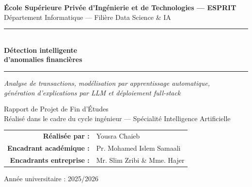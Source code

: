 \documentclass[12pt,a4paper,twoside]{report}
\begin{document}

\begin{titlepage}
\centering

\vspace{1cm}

{\large \textbf{École Supérieure Privée d'Ingénierie et de Technologies --- ESPRIT}}\\[0.3cm]
{\large Département Informatique --- Filière Data Science \& IA}

\vspace{1.5cm}

\rule{\linewidth}{0.4pt}\\[0.4cm]
{\fontsize{24}{28}\selectfont \textbf{Détection intelligente\\[0.2cm] d'anomalies financières}}\\[0.4cm]
\rule{\linewidth}{0.4pt}

\vspace{0.6cm}

{\large \textit{Analyse de transactions, modélisation par apprentissage automatique,\\génération d'explications par LLM et déploiement full-stack}}

\vspace{1.5cm}

{\large Rapport de Projet de Fin d'Études}\\[0.2cm]
{\normalsize Réalisé dans le cadre du cycle ingénieur --- Spécialité Intelligence Artificielle}

\vspace{1.5cm}

\begin{tabular}{rl}
  \textbf{Réalisée par :}          & Yousra Chaieb \\[0.2cm]
  \textbf{Encadrant académique :}  & Pr. Mohamed Islem Samaali \\[0.2cm]
  \textbf{Encadrants entreprise :} & Mr. Slim Zribi \& Mme. Hajer \\[0.2cm]
\end{tabular}

\vfill

{\large Année universitaire : 2025/2026}

\end{titlepage}

\clearpage
{}

\end{document}
